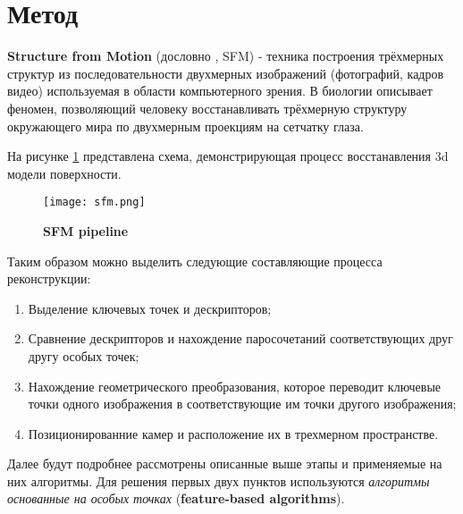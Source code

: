\section{Метод }

\textbf{Structure from Motion} (дословно , SFM) - техника построения трёхмерных структур из последовательности двухмерных изображений (фотографий, кадров видео) используемая в области компьютерного зрения. В биологии описывает феномен, позволяющий человеку восстанавливать трёхмерную структуру окружающего мира по двухмерным проекциям на сетчатку глаза.

На рисунке \ref{fig:sfm} представлена схема, демонстрирующая процесс восстанавления 3d модели поверхности.

\begin{figure}[h]
    \centering
    \texttt{[image: sfm.png]}
    \caption{\textbf{SFM pipeline}}
    \label{fig:sfm}
\end{figure}

Таким образом можно выделить следующие составляющие процесса реконструкции:

\begin{enumerate}
    \item Выделение ключевых точек и дескрипторов;
    \item Сравнение дескрипторов и нахождение паросочетаний соответствующих друг другу особых точек;
    \item Нахождение геометрического преобразования, которое переводит ключевые точки одного изображения в соответствующие им точки другого изображения;
    \item Позиционированние камер и расположение их в трехмерном пространстве.
\end{enumerate}

Далее будут подробнее рассмотрены описанные выше этапы и применяемые на них алгоритмы. Для решения первых двух пунктов используются \textit{алгоритмы основанные на особых точках} (\textbf{feature-based algorithms}).
